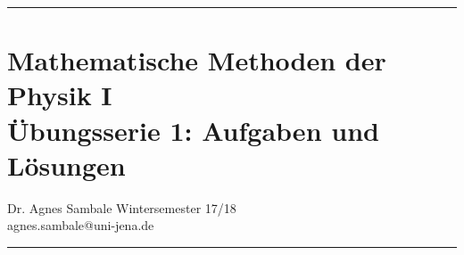 \documentclass[a4paper,fleqn, 10pt]{article}
\begin{document}
	\pagestyle{empty}

	\hrule
	\section*{\centering Mathematische Methoden der Physik I \\ Übungsserie 1: Aufgaben und Lösungen}
	\medskip
	Dr. Agnes Sambale \hfill Wintersemester 17/18\\
	agnes.sambale@uni-jena.de
	\bigskip
	\hrule
	\bigskip
	\bigskip


	
	
	







\end{document}

